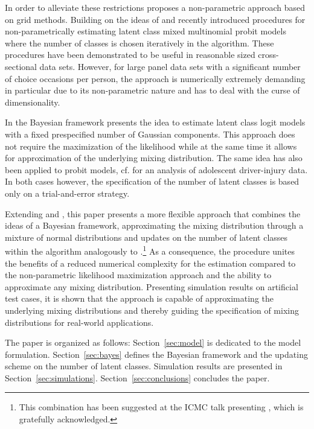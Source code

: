 \documentclass[article]{jss}
\begin{document}
In order to alleviate these restrictions \cite{Train:16} proposes a non-parametric approach based on grid methods. Building on the ideas of \cite{Train:16} and \cite{Bhat:18} recently \cite{Bauer:19} introduced procedures for non-parametrically estimating latent class mixed multinomial probit models where the number of classes is chosen iteratively in the algorithm. These procedures have been demonstrated to be useful in reasonable sized cross-sectional data sets. However, for large panel data sets with a significant number of choice occasions per person, the approach is numerically extremely demanding in particular due to its non-parametric nature and has to deal with the curse of dimensionality.

In the Bayesian framework \cite{Scaccia:10} presents the idea to estimate latent class logit models with a fixed prespecified number of Gaussian components. This approach does not require the maximization of the likelihood while at the same time it allows for approximation of the underlying mixing distribution. The same idea has also been applied to probit models, cf. \cite{Xiong:13} for an analysis of adolescent driver-injury data. In both cases however, the specification of the number of latent classes is based only on a trial-and-error strategy.

Extending \cite{Scaccia:10} and \cite{Xiong:13}, this paper presents a more flexible approach that combines the ideas of a Bayesian framework, approximating the mixing distribution through a mixture of normal distributions and updates on the number of latent classes within the algorithm analogously to \cite{Bauer:19}.\footnote{This combination has been suggested at the ICMC talk presenting \cite{Bauer:19}, which is gratefully acknowledged.} As a consequence, the procedure unites the benefits of a reduced numerical complexity for the estimation compared to the non-parametric likelihood maximization approach and the ability to approximate any mixing distribution. Presenting simulation results on artificial test cases, it is shown that the approach is capable of approximating the underlying mixing distributions and thereby guiding the specification of mixing distributions for real-world applications.

\enlargethispage{0.2cm}
The paper is organized as follows: Section~\ref{sec:model} is dedicated to the model formulation. Section~\ref{sec:bayes} defines the Bayesian framework and the updating scheme on the number of latent classes. Simulation results are presented in Section~\ref{sec:simulations}. Section~\ref{sec:conclusions} concludes the paper.
\end{document}
